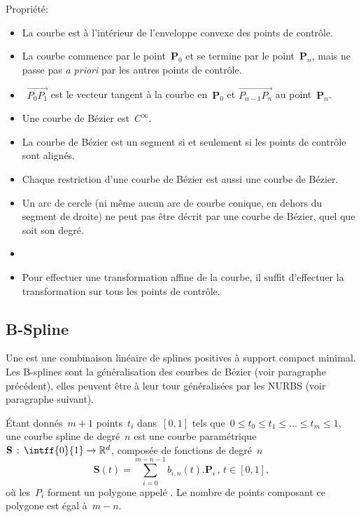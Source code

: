 \medskip
Propriété:
\begin{itemize}
  \item La courbe est à l'intérieur de l'enveloppe convexe des points de contrôle.
  \item La courbe commence par le point~$\mathbf{P}_0$ et se termine par le point~$\mathbf{P}_n$, 
	mais ne passe pas \emph{a priori} par les autres points de contrôle.
  \item~$\overrightarrow{P_0P_1}$ est le vecteur tangent à la courbe en~$\mathbf{P}_0$ et
	$\overrightarrow{P_{n-1}P_n}$ au point~$\mathbf{P}_n$.
  \item Une courbe de Bézier est~$C^{\infty}$.
  \item La courbe de Bézier est un segment si et seulement si les points de contrôle sont alignés.
  \item Chaque restriction d'une courbe de Bézier est aussi une courbe de Bézier.
  \item Un arc de cercle (ni même aucun arc de courbe conique, en dehors du segment de droite) ne peut pas 
	être décrit par une courbe de Bézier, quel que soit son degré.
  \item {}
  \item Pour effectuer une transformation affine de la courbe, il suffit d'effectuer la transformation sur tous 
	les points de contrôle.
\end{itemize}


\medskip
\subsection{B-Spline}

Une  est une combinaison linéaire de splines positives à support compact minimal. 
Les B-splines sont la généralisation des courbes de Bézier (voir paragraphe précédent), elles peuvent être 
à leur tour généralisées par les NURBS (voir paragraphe suivant).

\medskip
Étant donnés~$m+1$ points~$t_i$ dans~$[0, 1]$ tels que~$0 \le t_0 \le t_1 \le \ldots \le t_m \le 1$,
une courbe spline de degré~$n$ est une courbe paramétrique~$\mathbf{S} \,:\, \intff{0}{1} \to \mathbb{R}^d$,
composée de fonctions  de degré~$n$
\begin{equation}
  \mathbf{S}(t) = \sum_{i = 0}^{m - n - 1} b_{i, n} (t) . \mathbf{P}_{i} \,,\, t \in [0, 1],
\end{equation}
où les~$P_i$ forment un polygone appelé . 
Le nombre de points composant ce polygone est égal à~$m-n$.

